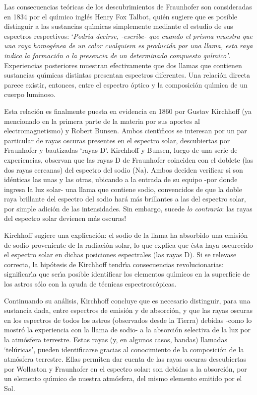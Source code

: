 \documentclass{article}
\begin{document}
Las consecuencias te\'oricas de los descubrimientos de Fraunhofer son 
consideradas en 1834 por el qu\'\i mico ingl\'es Henry Fox Talbot, qui\'en
sugiere que es posible distinguir a las sustancias qu\'\i micas simplemente
mediante el estudio de sus espectros respectivos: `{\it Podr\'\i a decirse,
-escribe- que cuando el prisma muestra que una raya homog\'enea de un color
cualquiera es producida por una llama, esta raya indica la formaci\'on o la
presencia de un determinado compuesto qu\'\i mico'}. Experiencias posteriores
muestran efectivamente que dos llamas que contienen sustancias qu\'\i micas
distintas presentan espectros diferentes. Una relaci\'on directa parece 
existir, entonces, entre el espectro \'optico y la composici\'on qu\'\i mica
de un cuerpo luminoso. 

Esta relaci\'on es finalmente puesta en evidencia en 1860 por Gustav Kirchhoff
(ya mencionado en la primera parte de la materia por sus aportes al 
electromagnetismo) y Robert Bunsen. Ambos cient\'\i ficos se interesan por
un par particular de rayas oscuras presentes en el espectro solar, descubiertas
por Fraunhofer y bautizadas `rayas D'. Kirchhoff y Bunsen, luego de una
serie de experiencias, observan que las rayas D de Fraunhofer coinciden con el
doblete (las dos rayas cercanas) del espectro del sodio (Na). Ambos deciden
verificar si son id\'enticas las unas y las otras, ubicando a la entrada
de su equipo -por donde ingresa la luz solar- una llama que contiene sodio,
convencidos de que la doble raya brillante del espectro del sodio har\'a m\'as
brillantes a las del espectro solar, por simple adici\'on de las intensidades.
Sin embargo, sucede {\it lo contrario}: las rayas del espectro solar devienen
m\'as oscuras!

Kirchhoff sugiere una explicaci\'on: el sodio de la llama ha absorbido una
emisi\'on de sodio proveniente de la radiaci\'on solar, lo que explica que 
\'esta haya oscurecido el espectro solar en dichas posiciones espectrales (las
rayas D). Si se relevase correcta, la hip\'otesis de Kirchhoff tendr\'\i a 
consecuencias revolucionarias: significar\'\i a que ser\'\i a posible 
identificar los elementos qu\'\i micos en la superficie de los astros s\'olo
con la ayuda de t\'ecnicas espectrosc\'opicas. 

Continuando su an\'alisis, Kirchhoff concluye que es necesario distinguir, 
para una sustancia dada, entre espectros de emisi\'on y de absorci\'on, y que
las rayas oscuras en los espectros de todos los astros (observados desde 
la Tierra) debidas -como lo mostr\'o la experiencia con la llama de sodio- a
la absorci\'on selectiva de la luz por la atm\'osfera terrestre. Estas rayas
(y, en algunos casos, bandas) llamadas `tel\'uricas', pueden identificarse
gracias al conocimiento de la composici\'on de la atm\'osfera terrestre. Ellas
permiten dar cuenta de las rayas oscuras descubiertas por Wollaston y 
Fraunhofer en el espectro solar: son debidas a la absorci\'on, por un elemento
qu\'\i mico de nuestra atm\'osfera, del mismo elemento emitido por el Sol.
\end{document}

